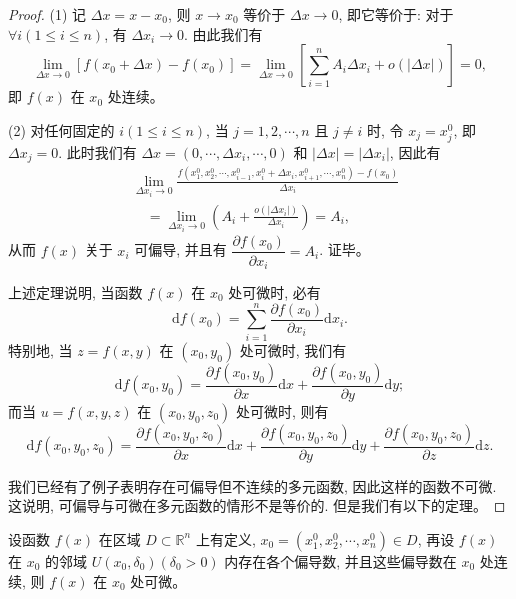 \documentclass[UTF8,12pt,a4paper,fontset=fandol]{ctexart}
\begin{document}
\begin{proof}\quad (1) 记 $\Delta x=x-x_0$, 则 $x\to x_0$ 等价于 $\Delta x\to0$, 即它等价于: 对于 $\forall i(1\leqslant i\leqslant n)$, 有 $\Delta x_i\to0$. 由此我们有
\[
  \lim_{\Delta x\to0}[f(x_0+\Delta x)-f(x_0)]
  =
  \lim_{\Delta x\to0}\left[\sum_{i=1}^n A_i\Delta x_i+o(|\Delta x|)\right]=0,
\]
即 $f(x)$ 在 $x_0$ 处连续。

(2) 对任何固定的 $i(1\leqslant i\leqslant n)$, 当 $j=1,2,\cdots,n$ 且 $j\ne i$ 时, 令 $x_j=x_j^0$, 即 $\Delta x_j=0$. 此时我们有 $\Delta x=(0,\cdots,\Delta x_i,\cdots,0)$ 和 $|\Delta x|=|\Delta x_i|$, 因此有
\[
\begin{aligned}
&\lim_{\Delta x_i\to0}
  \frac{f(x_1^0,x_2^0,\cdots,x_{i-1}^0,x_i^0+\Delta x_i,x_{i+1}^0,\cdots,x_n^0)-f(x_0)}{\Delta x_i}\\
&\quad =
  \lim_{\Delta x_i\to0}\left(A_i+\frac{o(|\Delta x_i|)}{\Delta x_i}\right)=A_i,
\end{aligned}
\]
从而 $f(x)$ 关于 $x_i$ 可偏导, 并且有 $\dfrac{\partial f(x_0)}{\partial x_i}=A_i$. 证毕。

上述定理说明, 当函数 $f(x)$ 在 $x_0$ 处可微时, 必有
\[
  \mathrm df(x_0)=\sum_{i=1}^n\frac{\partial f(x_0)}{\partial x_i}\mathrm dx_i.
\]
特别地, 当 $z=f(x,y)$ 在 $(x_0,y_0)$ 处可微时, 我们有
\[
  \mathrm df(x_0,y_0)=\frac{\partial f(x_0,y_0)}{\partial x}\mathrm dx+
  \frac{\partial f(x_0,y_0)}{\partial y}\mathrm dy;
\]
而当 $u=f(x,y,z)$ 在 $(x_0,y_0,z_0)$ 处可微时, 则有
\[
  \mathrm df(x_0,y_0,z_0)=
  \frac{\partial f(x_0,y_0,z_0)}{\partial x}\mathrm dx+
  \frac{\partial f(x_0,y_0,z_0)}{\partial y}\mathrm dy+
  \frac{\partial f(x_0,y_0,z_0)}{\partial z}\mathrm dz.
\]

我们已经有了例子表明存在可偏导但不连续的多元函数, 因此这样的函数不可微. 这说明, 可偏导与可微在多元函数的情形不是等价的. 但是我们有以下的定理。

\end{proof}
\begin{theorem}\label{course-theorem-14-1-2}\quad 设函数 $f(x)$ 在区域 $D\subset\mathbb R^n$ 上有定义, $x_0=(x_1^0,x_2^0,\cdots,x_n^0)\in D$, 再设 $f(x)$ 在 $x_0$ 的邻域 $U(x_0,\delta_0)(\delta_0>0)$ 内存在各个偏导数, 并且这些偏导数在 $x_0$ 处连续, 则 $f(x)$ 在 $x_0$ 处可微。

\end{theorem}
\end{document}
